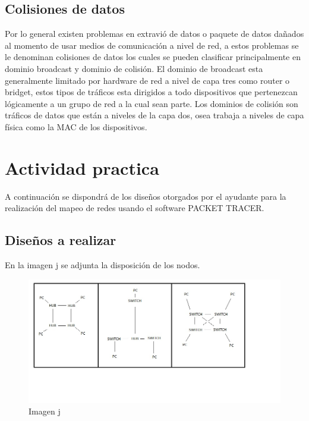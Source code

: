 \documentclass[spanish]{udpreport}
\begin{document}
\section{Colisiones de datos}
Por lo general existen problemas en extravió de datos o paquete de datos dañados al momento de usar medios de comunicación a nivel de red, a estos problemas se le denominan colisiones de datos los cuales se pueden clasificar principalmente en dominio broadcast y dominio de colisión.
El dominio de broadcast esta generalmente limitado por hardware de red a nivel de capa tres como router o bridget, estos tipos de tráficos esta dirigidos a todo dispositivos que pertenezcan lógicamente a un grupo de red a la cual sean parte. Los dominios de colisión son tráficos de datos que están a niveles de la capa dos, osea trabaja a niveles de capa física como la MAC de los dispositivos.
\newpage
\chapter{Actividad practica}
A continuación se  dispondrá de los diseños otorgados por el ayudante para la realización del mapeo de redes usando el software PACKET TRACER.
\section{Diseños a realizar}
En la imagen j se adjunta la disposición de los nodos.
\begin{figure}[h]
    \centering
    \includegraphics[scale=0.4]{images/listo.png}
    \caption{Imagen j}
    \label{fig:my_label}
\end{figure}
\end{document}
